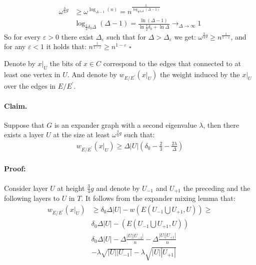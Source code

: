 \documentclass{article}
\begin{document}
\begin{multicols*}{2}
\begin{equation*}
  \begin{split}
    \omega^{\frac{3}{4}g}&\ge \omega^{\log_{\Delta-1}\left( n \right)} = n^{\frac{1}{\log_{\frac{1}{2}\delta_{0}\Delta}\left( \Delta -1 \right)}} \\ 
    & \log_{\frac{1}{2}\delta_{0}\Delta}\left( \Delta -1 \right) = \frac{\ln\left( \Delta-1 \right)}{\ln\frac{1}{2}\delta_{0}+ \ln \Delta} \rightarrow_{\Delta\rightarrow \infty} 1
  \end{split}
\end{equation*} So for every $\varepsilon >0 $ there exist $\Delta_{\varepsilon}$ such that for $\Delta > \Delta_{\varepsilon}$ we get: $\omega^{\frac{3}{4}g} \ge n^{\frac{1}{1-\varepsilon}}$, and for any $\varepsilon < 1$ it holds that: $ n^{\frac{1}{1-\varepsilon}}\ge n^{1-\varepsilon}$ $\square$

Denote by $x|_{U}$ the bits of $x\in C$ correspond to the edges that connected to at least one vertex in $U$. And denote by $w_{E/E^{\prime}}\left( x|_{U} \right)$ the weight induced by the $x|_{U}$ over the edges in $E/E^\prime$.
\paragraph{Claim.} Suppose that $G$ is an expander graph with a second eigenvalue $\lambda$, then there exists a layer $U$ at the size at least $\omega^{ \frac{3}{4}g }$ such that:
\begin{equation*}
  \begin{split}
    w_{E/E^{\prime}}\left( x|_{U} \right)\ge\Delta|U|\left( \delta_{0}-\frac{2}{3}-\frac{2\lambda}{\Delta} \right)
  \end{split}
\end{equation*}
\paragraph{Proof:} Consider layer $U$ at height $\frac{3}{4}g$ and denote by $U_{-1}$ and $U_{+1}$ the preceding and the following layers to $U$ in $T$. It follows from the expander mixing lemma that:
\begin{equation*}
  \begin{split}
    w_{E/E^{\prime}}\left( x|_{U} \right) & \ge \delta_{0}\Delta|U| -w\left( E(U_{-1} \bigcup U_{+1} ,U)  \right) \ge \\ 
    & \delta_{0}\Delta|U| -\left( E(U_{-1} \bigcup U_{+1} ,U)  \right) \\ 
    &  \delta_{0}\Delta|U| - \Delta\frac{|U||U_{-1}|}{n} - \Delta\frac{|U||U_{+1}|}{n} \\
    & -\lambda\sqrt{|U||U_{-1}|} - \lambda\sqrt{|U||U_{+1}|}
  \end{split}
\end{equation*}


\end{multicols*}
\end{document}

